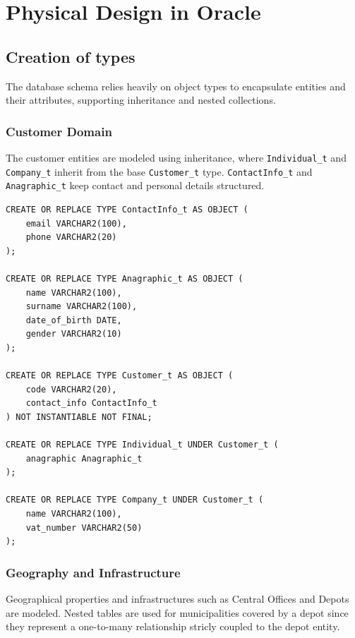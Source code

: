 \section{Physical Design in Oracle}

\subsection{Creation of types}

The database schema relies heavily on object types to encapsulate entities and their attributes, supporting inheritance and nested collections.

\subsubsection{Customer Domain}
The customer entities are modeled using inheritance, where \texttt{Individual\_t} and \texttt{Company\_t} inherit from the base \texttt{Customer\_t} type. \texttt{ContactInfo\_t} and \texttt{Anagraphic\_t} keep contact and personal details structured.

\begin{verbatim}
CREATE OR REPLACE TYPE ContactInfo_t AS OBJECT (
    email VARCHAR2(100), 
    phone VARCHAR2(20)
);

CREATE OR REPLACE TYPE Anagraphic_t AS OBJECT (
    name VARCHAR2(100), 
    surname VARCHAR2(100), 
    date_of_birth DATE, 
    gender VARCHAR2(10)
);

CREATE OR REPLACE TYPE Customer_t AS OBJECT (
    code VARCHAR2(20),
    contact_info ContactInfo_t
) NOT INSTANTIABLE NOT FINAL;

CREATE OR REPLACE TYPE Individual_t UNDER Customer_t (
    anagraphic Anagraphic_t
);

CREATE OR REPLACE TYPE Company_t UNDER Customer_t (
    name VARCHAR2(100),
    vat_number VARCHAR2(50)
);
\end{verbatim}

\subsubsection{Geography and Infrastructure}
Geographical properties and infrastructures such as Central Offices and Depots are modeled. Nested tables are used for municipalities covered by a depot since they represent a one-to-many relationship stricly coupled to the depot entity.

